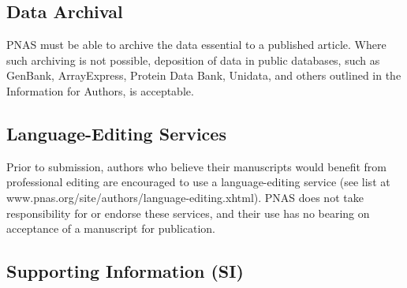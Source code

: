 \documentclass[10pt,twoside]{pnas-new}
\begin{document}
\subsection*{Data Archival}

PNAS must be able to archive the data essential to a published article. Where such archiving is not possible, deposition of data in public databases, such as GenBank, ArrayExpress, Protein Data Bank, Unidata, and others outlined in the Information for Authors, is acceptable.

\subsection*{Language-Editing Services}
Prior to submission, authors who believe their manuscripts would benefit from professional editing are encouraged to use a language-editing service (see list at www.pnas.org/site/authors/language-editing.xhtml). PNAS does not take responsibility for or endorse these services, and their use has no bearing on acceptance of a manuscript for publication. 






\subsection*{Supporting Information (SI)}
\end{document}
